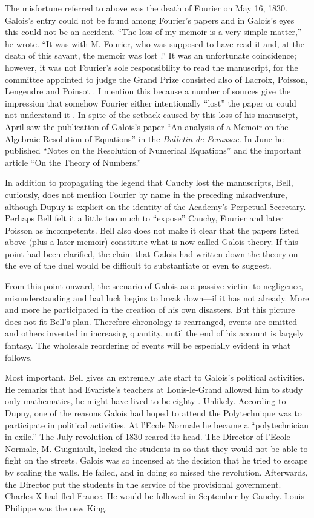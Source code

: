 \documentclass[12pt]{article}
\begin{document}
The misfortune referred to above was the death of Fourier on May 16, 1830. Galois's entry could not be found among Fourier's papers and in Galois's eyes this could not be an accident. ``The loss of my memoir is a very simple matter,'' he wrote. ``It was with M. Fourier, who was supposed to have read it and, at the death of this savant, the memoir was lost \cite{34}.'' It was an unfortunate coincidence; however, it was not Fourier's sole responsibility to read the manuscript, for the committee appointed to judge the Grand Prize consisted also of Lacroix, Poisson, Lengendre and Poinsot \cite{35}. I mention this because a number of sources give the impression that somehow Fourier either intentionally ``lost'' the paper or could not understand it \cite{36}. In spite of the setback caused by this loss of his manuscipt, April saw the publication of Galois's paper ``An analysis of a Memoir on the Algebraic Resolution of Equations'' in the \emph{Bulletin de Ferussac.} In June he published ``Notes on the Resolution of Numerical Equations'' and the important article ``On the Theory of Numbers.'' \cite{37}

In addition to propagating the legend that Cauchy lost the manuscripts, Bell, curiously, does not mention Fourier by name in the preceding misadventure, although Dupuy is explicit on the identity of the Academy's Perpetual Secretary. Perhaps Bell felt it a little too much to ``expose'' Cauchy, Fourier and later Poisson as incompetents. Bell also does not make it clear that the papers listed above (plus a later memoir) constitute what is now called Galois theory. If this point had been clarified, the claim that Galois had written down the theory on the eve of the duel would be difficult to substantiate or even to suggest.

From this point onward, the scenario of Galois as a passive victim to negligence, misunderstanding and bad luck begins to break down---if it has not already. More and more he participated in the creation of his own disasters. But this picture does not fit Bell's plan. Therefore chronology is rearranged, events are omitted and others invented in increasing quantity, until the end of his account is largely fantasy. The wholesale reordering of events will be especially evident in what follows.

Most important, Bell gives an extremely late start to Galois's political activities. He remarks that had Evariste's teachers at Louis-le-Grand allowed him to study only mathematics, he might have lived to be eighty \cite{38}. Unlikely. According to Dupuy, one of the reasons Galois had hoped to attend the Polytechnique was to participate in political activities. At l'Ecole Normale he became a ``polytechnician in exile.'' The July revolution of 1830 reared its head. The Director of l'Ecole Normale, M. Guigniault, locked the students in so that they would not be able to fight on the streets. Galois was so incensed at the decision that he tried to escape by scaling the walls. He failed, and in doing so missed the revolution. Afterwards, the Director put the students in the service of the provisional government. Charles X had fled France. He would be followed in September by Cauchy. Louis-Philippe was the new King.
\end{document}
